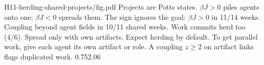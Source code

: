 {H11-herding-shared-projects/fig.pdf}
{Projects are Potts states. $\beta J>0$ piles agents onto one; $\beta J<0$ spreads them.}
{The sign ignores the goal: $\beta J>0$ in 11/14 weeks. Coupling beyond agent fields in 10/11 shared weeks. Work commits herd too (4/6). Spread only with own artifacts.}
{Expect herding by default. To get parallel work, give each agent its own artifact or role. A coupling $z\ge2$ on artifact links flags duplicated work.}
{0.75}{2.06}
